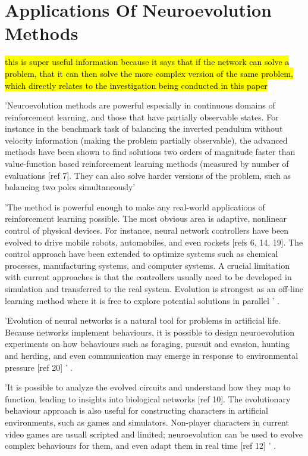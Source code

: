 \section{Applications Of Neuroevolution Methods}

\hl{this is super useful information because it says that if the network can solve a problem, that it can then solve the more complex version of the same problem, which directly relates to the investigation being conducted in this paper}

'Neuroevolution methods are powerful especially in continuous domains of reinforcement learning, and those that have partially observable states. For instance in the benchmark task of balancing the inverted pendulum without velocity information (making the problem partially observable), the advanced methods have been shown to find solutions two orders of magnitude faster than value-function based reinforcement learning methods (measured by number of evaluations [ref 7]. They can also solve harder versions of the problem, such as balancing two poles simultaneously'

'The method is powerful enough to make any real-world applications of reinforcement learning possible. The most obvious area is adaptive, nonlinear control of physical devices. For instance, neural network controllers have been evolved to drive mobile robots, automobiles, and even rockets [refs 6, 14, 19]. The control approach have been extended to optimize systems such as chemical processes, manufacturing systems, and computer systems. A crucial limitation with current approaches is that the controllers usually need to be developed in simulation and transferred to the real system. Evolution is strongest as an off-line learning method where it is free to explore potential solutions in parallel ' \cite{Miikkulainen2010}.

'Evolution of neural networks is a natural tool for problems in artificial life. Because networks implement behaviours, it is possible to design neuroevolution experiments on how behaviours such as foraging, pursuit and evasion, hunting and herding, and even communication may emerge in response to environmental pressure [ref 20] ' \cite{Miikkulainen2010}.

'It is possible to analyze the evolved circuits and understand how they map to function, leading to insights into biological networks [ref 10]. The evolutionary behaviour approach is also useful for constructing characters in artificial environments, such as games and simulators. Non-player characters in current video games are usuall scripted and limited; neuroevolution can be used to evolve complex behaviours for them, and even adapt them in real time [ref 12] ' \cite{Miikkulainen2010}.


